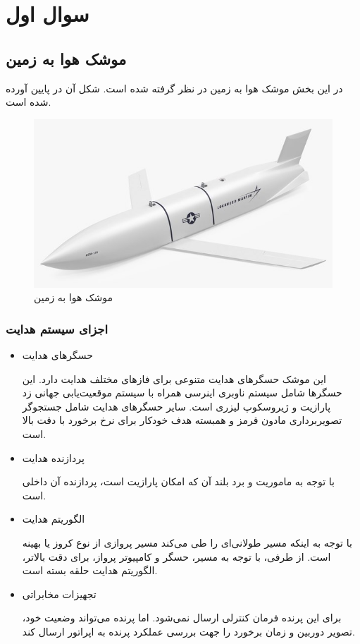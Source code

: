 \section{سوال اول}
\subsection{موشک هوا به زمین}
در این بخش موشک هوا به زمین
در نظر گرفته شده است. شکل آن در پایین آورده شده است.
 \begin{figure}[H]
	\centering
	\includegraphics[width=\linewidth]{../Figure/Q1/agm_158.jpg}
	\caption{موشک هوا به زمین
}
\end{figure}
\subsubsection{اجزای سیستم هدایت}
\begin{itemize}
	\item حسگرهای هدایت
	
	
	این موشک حسگرهای هدایت متنوعی برای فازهای مختلف هدایت دارد. این حسگرها شامل سیستم ناوبری اینرسی
	 همراه با سیستم موقعیت‌یابی جهانی زد پارازیت
	 و ژیروسکوپ لیزری
	 است. سایر حسگرهای هدایت شامل جستجوگر تصویربرداری مادون قرمز
	و همبسته هدف خودکار
	برای نرخ برخورد با دقت بالا است.
	\item پردازنده هدایت
	
	
	با توجه به ماموریت و برد بلند آن که امکان پارازیت است، پردازنده آن داخلی است.
	\item الگوریتم هدایت
	
	
	با توجه به اینکه مسیر طولانی‌ای را طی می‌کند مسیر پروازی از نوع کروز یا بهینه است. از طرفی، با توجه به مسیر، حسگر و کامپیوتر پرواز، برای دقت بالاتر، الگوریتم هدایت حلقه بسته است.
	\item تجهیزات مخابراتی
	
	
	برای این پرنده فرمان کنترلی ارسال نمی‌شود. اما پرنده می‌تواند وضعیت خود، تصویر دوربین و زمان برخورد را جهت بررسی عملکرد پرنده به اپراتور ارسال کند.
\end{itemize}
